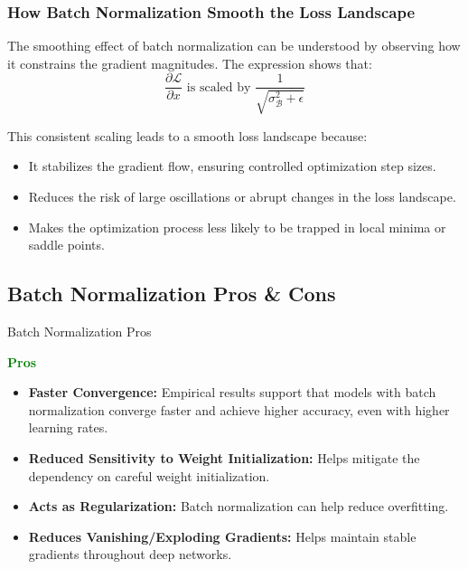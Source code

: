 \documentclass[serif, aspectratio=169]{beamer}
\begin{document}
\begin{frame}
    \frametitle{How Batch Normalization Smooth the  Loss Landscape}

    The smoothing effect of batch normalization can be understood by observing how it constrains the gradient magnitudes. The expression shows that:
    \begin{equation}
        \frac{\partial \mathcal{L}}{\partial x} \text{ is scaled by } \frac{1}{\sqrt{\sigma_{\mathcal{B}}^2 + \epsilon}}
    \end{equation}

    This consistent scaling leads to a smooth loss landscape because:
    \begin{itemize}
        \item It stabilizes the gradient flow, ensuring controlled optimization step sizes.
        \item Reduces the risk of large oscillations or abrupt changes in the loss landscape.
        \item Makes the optimization process less likely to be trapped in local minima or saddle points.
    \end{itemize}
\end{frame}


\subsection{Batch Normalization Pros \& Cons}

\begin{frame}{Batch Normalization Pros}

    \textcolor{green}{\textbf{Pros}}
    
    \begin{itemize}

        \item \textbf{Faster Convergence:}  Empirical results support that models with batch normalization converge faster and achieve higher accuracy, even with higher learning rates.
        \item \textbf{Reduced Sensitivity to  Weight Initialization:} Helps mitigate the dependency on careful weight initialization.
        \item \textbf{Acts as Regularization:} Batch normalization can help reduce overfitting.
        \item \textbf{Reduces Vanishing/Exploding Gradients:} Helps maintain stable gradients throughout deep networks.


    \end{itemize}
\end{frame}
\end{document}
